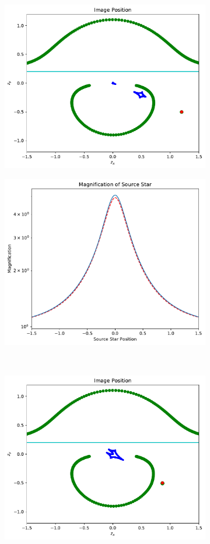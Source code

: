 \documentclass{article}
\begin{document}
\begin{figure}[h]
\begin{subfigure}{.5\textwidth}
\begin{minipage}[c]{0.85\textwidth}
    \includegraphics[width=7 cm]{Image_and_Caustic_Curves_x_1_2_-0_5j.pdf}
  \end{minipage}\hfill
\end{subfigure}%
\begin{subfigure}{.5\textwidth}
  \begin{minipage}{0.1\textwidth}
    \caption{} \label{fig:Magnification_1_2_-0_5j}
  \end{minipage}\hfill
\begin{minipage}[c]{0.85\textwidth}
    \includegraphics[width=7 cm]{Magnification_x_1_2_-0_5j.pdf}
  \end{minipage}\hfill
\end{subfigure} \\
\begin{subfigure}{.5\textwidth}
  \begin{minipage}{0.1\textwidth}
    \caption{} \label{fig:Image_sqrt3_2_n0_5j}
  \end{minipage}\hfill
\begin{minipage}[c]{0.85\textwidth}
    \includegraphics[width=7 cm]{Image_and_Caustic_Curves_x_sqrt3_2_-0_5j.pdf}

\end{minipage}
\end{subfigure}
\end{figure}
\end{document}
